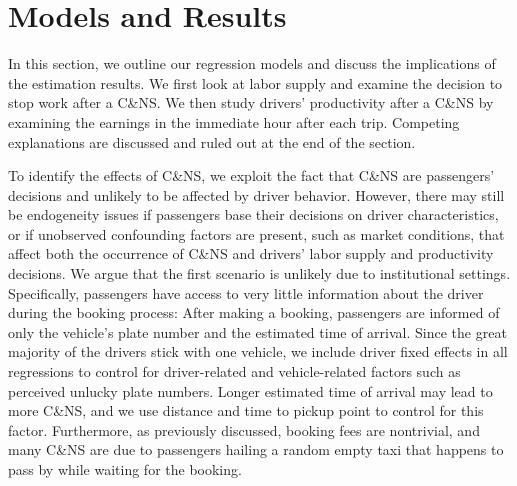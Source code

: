 \documentclass[reviewmode,AEJ]{AEA}
\begin{document}
\section{Models and Results}
\label{sec:main}

In this section, we outline our regression models and discuss the implications of the estimation results.
We first look at labor supply and examine the decision to stop work after a C\&NS.
We then study drivers' productivity after a C\&NS by examining the earnings in the immediate hour after each trip. 
Competing explanations are discussed and ruled out at the end of the section.

To identify the effects of C\&NS, we exploit the fact that C\&NS are passengers' decisions and unlikely to be
affected by driver behavior. However, there may still be endogeneity issues if passengers base their decisions 
on driver characteristics, or if unobserved confounding factors are present, such as market conditions,
that affect both the occurrence of C\&NS and drivers' labor supply and productivity decisions. 
We argue that the first scenario is unlikely due to institutional settings. Specifically, passengers have 
access to very little information about the driver during the booking process: After making a booking, 
passengers are informed of only the vehicle's plate number and the estimated time of arrival. 
Since the great majority of the drivers stick with one vehicle, we include driver fixed effects in all
regressions to control for driver-related and vehicle-related factors such as perceived unlucky plate numbers.
Longer estimated time of arrival may lead to more C\&NS, and we use distance and time to pickup point to 
control for this factor. 
Furthermore, as previously discussed, booking fees are nontrivial, and many C\&NS are due to passengers
hailing a random empty taxi that happens to pass by while waiting for the booking. 
\end{document}
